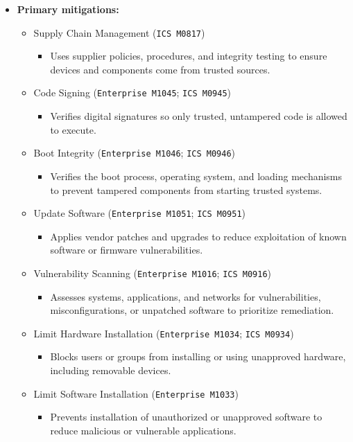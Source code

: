 \documentclass[10pt,a4paper,oneside]{report}
\begin{document}
\begin{itemize}
\item \textbf{Primary mitigations:}
\begin{itemize}
\item Supply Chain Management (\texttt{ICS M0817})
\begin{itemize}
\item Uses supplier policies, procedures, and integrity testing to ensure devices and components come from trusted sources.
\end{itemize}
\item Code Signing (\texttt{Enterprise M1045}; \texttt{ICS M0945})
\begin{itemize}
\item Verifies digital signatures so only trusted, untampered code is allowed to execute.
\end{itemize}
\item Boot Integrity (\texttt{Enterprise M1046}; \texttt{ICS M0946})
\begin{itemize}
\item Verifies the boot process, operating system, and loading mechanisms to prevent tampered components from starting trusted systems.
\end{itemize}
\item Update Software (\texttt{Enterprise M1051}; \texttt{ICS M0951})
\begin{itemize}
\item Applies vendor patches and upgrades to reduce exploitation of known software or firmware vulnerabilities.
\end{itemize}
\item Vulnerability Scanning (\texttt{Enterprise M1016}; \texttt{ICS M0916})
\begin{itemize}
\item Assesses systems, applications, and networks for vulnerabilities, misconfigurations, or unpatched software to prioritize remediation.
\end{itemize}
\item Limit Hardware Installation (\texttt{Enterprise M1034}; \texttt{ICS M0934})
\begin{itemize}
\item Blocks users or groups from installing or using unapproved hardware, including removable devices.
\end{itemize}
\item Limit Software Installation (\texttt{Enterprise M1033})
\begin{itemize}
\item Prevents installation of unauthorized or unapproved software to reduce malicious or vulnerable applications.
\end{itemize}
\end{itemize}
\end{itemize}
\end{document}
